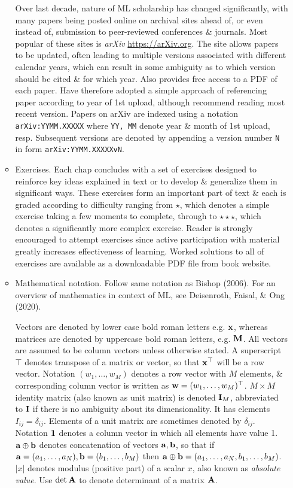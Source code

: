 \documentclass{article}
\begin{document}
\begin{enumerate}
\begin{itemize}
		Over last decade, nature of ML scholarship has changed significantly, with many papers being posted online on archival sites ahead of, or even instead of, submission to peer-reviewed conferences \& journals. Most popular of these sites is {\it arXiv} \url{https://arXiv.org}. The site allows papers to be updated, often leading to multiple versions associated with different calendar years, which can result in some ambiguity as to which version should be cited \& for which year. Also provides free access to a PDF of each paper. Have therefore adopted a simple approach of referencing paper according to year of 1st upload, although recommend reading most recent version. Papers on arXiv are indexed using a notation {\tt arXiv:YYMM.XXXXX} where {\tt YY, MM} denote year \& month of 1st upload, resp. Subsequent versions are denoted by appending a version number {\tt N} in form {\tt arXiv:YYMM.XXXXXvN}.
		\item {\sf Exercises.} Each chap concludes with a set of exercises designed to reinforce key ideas explained in text or to develop \& generalize them in significant ways. These exercises form an important part of text \& each is graded according to difficulty ranging from $\star$, which denotes a simple exercise taking a few moments to complete, through to $\star\star\star$, which denotes a significantly more complex exercise. Reader is strongly encouraged to attempt exercises since active participation with material greatly increases effectiveness of learning. Worked solutions to all of exercises are available as a downloadable PDF file from book website.
		\item {\sf Mathematical notation.} Follow same notation as Bishop (2006). For an overview of mathematics in context of ML, see Deisenroth, Faisal, \& Ong (2020).
		
		Vectors are denoted by lower case bold roman letters e.g. ${\bf x}$, whereas matrices are denoted by uppercase bold roman letters, e.g. ${\bf M}$. All vectors are assumed to be column vectors unless otherwise stated. A superscript $\top$ denotes transpose of a matrix or vector, so that ${\bf x}^\top$ will be a row vector. Notation $(w_1,\ldots,w_M)$ denotes a row vector with $M$ elements, \& corresponding column vector is written as ${\bf w} = (w_1,\ldots,w_M)^\top$. $M\times M$ identity matrix (also known as unit matrix) is denoted ${\bf I}_M$, abbreviated to ${\bf I}$ if there is no ambiguity about its dimensionality. It has elements $I_{ij} = \delta_{ij}$. Elements of a unit matrix are sometimes denoted by $\delta_{ij}$. Notation ${\bf1}$ denotes a column vector in which all elements have value 1. ${\bf a}\oplus{\bf b}$ denotes concatenation of vectors ${\bf a},{\bf b}$, so that if ${\bf a} = (a_1,\ldots,a_N),{\bf b} = (b_1,\ldots,b_M)$ then ${\bf a}\oplus{\bf b} = (a_1,\ldots,a_N,b_1,\ldots,b_M)$. $|x|$ denotes modulus (positive part) of a scalar $x$, also known as {\it absolute value}. Use $\det{\bf A}$ to denote determinant of a matrix ${\bf A}$.
		

\end{itemize}
\end{enumerate}
\end{document}
